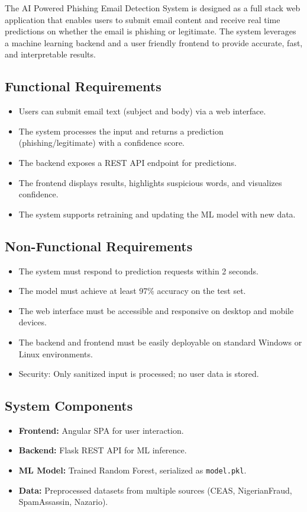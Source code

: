 \documentclass{article}
\begin{document}
The AI Powered Phishing Email Detection System is designed as a full stack web application that enables users to submit email content and receive real time predictions on whether the email is phishing or legitimate. The system leverages a machine learning backend and a user friendly frontend to provide accurate, fast, and interpretable results.

\subsection{Functional Requirements}
\begin{itemize}
    \item Users can submit email text (subject and body) via a web interface.
    \item The system processes the input and returns a prediction (phishing/legitimate) with a confidence score.
    \item The backend exposes a REST API endpoint for predictions.
    \item The frontend displays results, highlights suspicious words, and visualizes confidence.
    \item The system supports retraining and updating the ML model with new data.
\end{itemize}

\subsection{Non-Functional Requirements}
\begin{itemize}
    \item The system must respond to prediction requests within 2 seconds.
    \item The model must achieve at least 97\% accuracy on the test set.
    \item The web interface must be accessible and responsive on desktop and mobile devices.
    \item The backend and frontend must be easily deployable on standard Windows or Linux environments.
    \item Security: Only sanitized input is processed; no user data is stored.
\end{itemize}

\subsection{System Components}
\begin{itemize}
    \item \textbf{Frontend:} Angular SPA for user interaction.
    \item \textbf{Backend:} Flask REST API for ML inference.
    \item \textbf{ML Model:} Trained Random Forest, serialized as \texttt{model.pkl}.
    \item \textbf{Data:} Preprocessed datasets from multiple sources (CEAS, NigerianFraud, SpamAssassin, Nazario).
\end{itemize}
\newpage
\end{document}
